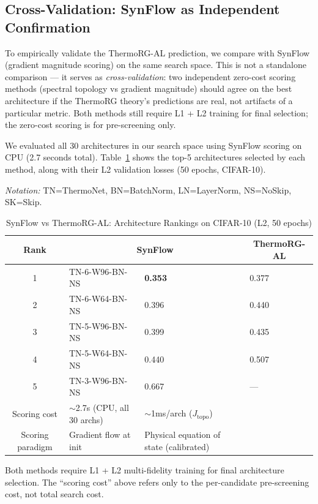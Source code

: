\documentclass[11pt, a4paper]{article}
\theoremstyle{plain}
\begin{document}
\subsection{Cross-Validation: SynFlow as Independent Confirmation}

To empirically validate the ThermoRG-AL prediction, we compare with SynFlow (gradient magnitude scoring) on the same search space. This is not a standalone comparison --- it serves as \emph{cross-validation}: two independent zero-cost scoring methods (spectral topology vs gradient magnitude) should agree on the best architecture if the ThermoRG theory's predictions are real, not artifacts of a particular metric. Both methods still require L1 + L2 training for final selection; the zero-cost scoring is for pre-screening only.

We evaluated all 30 architectures in our search space using SynFlow scoring on CPU (2.7 seconds total). Table~\ref{tab:naswot-comparison} shows the top-5 architectures selected by each method, along with their L2 validation losses (50 epochs, CIFAR-10).

\begin{table}[htbp]
\centering
\caption{SynFlow vs ThermoRG-AL: Architecture Rankings on CIFAR-10 (L2, 50 epochs)}
\label{tab:naswot-comparison}
\textit{Notation:} TN=ThermoNet, BN=BatchNorm, LN=LayerNorm, NS=NoSkip, SK=Skip.
\begin{tabular}{clll}
\toprule
Rank & \multicolumn{2}{c}{SynFlow} & \multicolumn{1}{c}{ThermoRG-AL} \\
\midrule
1 & TN-6-W96-BN-NS & \textbf{0.353} & 0.377 \\
2 & TN-6-W64-BN-NS & 0.396 & 0.440 \\
3 & TN-5-W96-BN-NS & 0.399 & 0.435 \\
4 & TN-5-W64-BN-NS & 0.440 & 0.507 \\
5 & TN-3-W96-BN-NS & 0.667 & --- \\
\midrule
Scoring cost & $\sim$2.7s (CPU, all 30 archs) & $\sim$1ms/arch ($J_{\mathrm{topo}}$) \\
Scoring paradigm & Gradient flow at init & Physical equation of state (calibrated) \\
\bottomrule
\end{tabular}
\end{table}
{\small * Both methods require L1 + L2 multi-fidelity training for final architecture selection. The ``scoring cost'' above refers only to the per-candidate pre-screening cost, not total search cost.}
\end{document}
